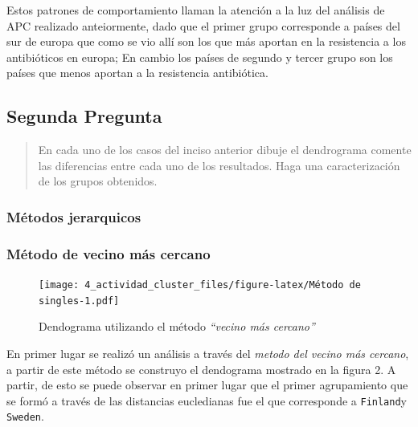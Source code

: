 \documentclass[
]{article}
\begin{document}
Estos patrones de comportamiento llaman la atención a la luz del
análisis de APC realizado anteiormente, dado que el primer grupo
corresponde a países del sur de europa que como se vio allí son los que
más aportan en la resistencia a los antibióticos en europa; En cambio
los países de segundo y tercer grupo son los países que menos aportan a
la resistencia antibiótica.

\hypertarget{segunda-pregunta}{%
\subsection{Segunda Pregunta}\label{segunda-pregunta}}

\begin{quote}
En cada uno de los casos del inciso anterior dibuje el dendrograma
comente las diferencias entre cada uno de los resultados. Haga una
caracterización de los grupos obtenidos.
\end{quote}

\hypertarget{muxe9todos-jerarquicos}{%
\subsubsection{Métodos jerarquicos}\label{muxe9todos-jerarquicos}}

\hypertarget{muxe9todo-de-vecino-muxe1s-cercano}{%
\subsubsection{Método de vecino más
cercano}\label{muxe9todo-de-vecino-muxe1s-cercano}}

\begin{figure}
\centering
\texttt{[image: 4\_actividad\_cluster\_files/figure-latex/Método de singles-1.pdf]}
\caption{Dendograma utilizando el método \emph{``vecino más cercano''}}
\end{figure}

En primer lugar se realizó un análisis a través del \emph{metodo del
vecino más cercano}, a partir de este método se construyo el dendograma
mostrado en la figura 2. A partir, de esto se puede observar en primer
lugar que el primer agrupamiento que se formó a través de las distancias
eucledianas fue el que corresponde a \texttt{Finland}y \texttt{Sweden}.
\end{document}
